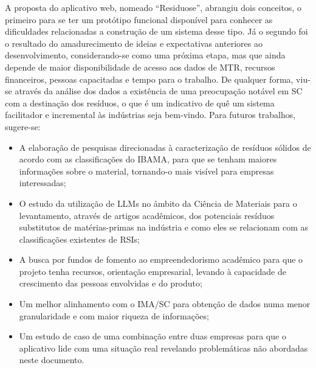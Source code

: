 A proposta do aplicativo web, nomeado “Residuose”, abrangiu dois conceitos, o primeiro para se ter um protótipo funcional disponível para conhecer as dificuldades relacionadas a construção de um sistema desse tipo. Já o segundo foi o resultado do amadurecimento de ideias e expectativas anteriores ao desenvolvimento, considerando-se como uma próxima etapa, mas que ainda depende de maior disponibilidade de acesso aos dados de \gls{MTR}, recursos financeiros, pessoas capacitadas e tempo para o trabalho. De qualquer forma, viu-se através da análise dos dados a existência de uma preocupação notável em \gls{SC} com a destinação dos resíduos, o que é um indicativo de quê um sistema facilitador e incremental às indústrias seja bem-vindo. Para futuros trabalhos, sugere-se:
\begin{itemize} 
	\item A elaboração de pesquisas direcionadas à caracterização de resíduos sólidos de acordo com as classificações do \gls{IBAMA}, para que se tenham maiores informações sobre o material, tornando-o mais visível para empresas interessadas;
	\item O estudo da utilização de \gls{LLM}s no âmbito da Ciência de Materiais para o levantamento, através de artigos acadêmicos, dos potenciais resíduos substitutos de matérias-primas na indústria e como eles se relacionam com as classificações existentes de \gls{RSI}s; 
	\item A busca por fundos de fomento ao empreendedorismo acadêmico para que o projeto tenha recursos, orientação empresarial, levando à capacidade de crescimento das pessoas envolvidas e do produto;
	\item Um melhor alinhamento com o \gls{IMA/SC} para obtenção de dados numa menor granularidade e com maior riqueza de informações;
	\item Um estudo de caso de uma combinação entre duas empresas para que o aplicativo lide com uma situação real revelando problemáticas não abordadas neste documento.
\end{itemize}